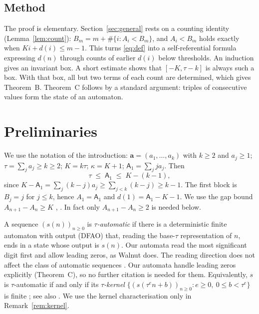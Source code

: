 \documentclass[11pt]{amsart}
\theoremstyle{definition}
\theoremstyle{remark}
\begin{document}
\subsection{Method}
The proof is elementary. Section~\ref{sec:general} rests on a counting identity (Lemma~\ref{lem:count}): $B_m=m+\#\{i:A_i<B_m\}$, and $A_i<B_m$ holds exactly when $Ki+d(i)\le m-1$. This turns \eqref{eq:def} into a self-referential formula expressing $d(n)$ through counts of earlier $d(i)$ below thresholds. An induction gives an invariant box. A short estimate shows that $[-K,\tau-k]$ is always such a box. With that box, all but two terms of each count are determined, which gives Theorem~B. Theorem~C follows by a standard argument: triples of consecutive values form the state of an automaton.

\section{Preliminaries}\label{sec:prelim}
We use the notation of the introduction: $\mathbf a=(a_1,\dots,a_k)$ with $k\ge2$ and $a_j\ge1$; $\tau=\sum_ja_j\ge k\ge2$; $K=k\tau$; $\kappa=K+1$; $\mathsf A_1=\sum_j j a_j$. Then
\begin{equation}\label{eq:A1range}
\tau\;\le\;\mathsf A_1\;\le\;K-(k-1),
\end{equation}
since $K-\mathsf A_1=\sum_j(k-j)a_j\ge\sum_{j<k}(k-j)\ge k-1$. The first block is $B_j=j$ for $j\le k$, hence $A_1=\mathsf A_1$ and $d(1)=\mathsf A_1-K-1$. We use the gap bound $A_{n+1}-A_n\ge K$ \cite[Lemma~2]{FJarxiv}, \cite[Lemma~1]{FJ}. In fact only $A_{n+1}-A_n\ge2$ is needed below.

A sequence $(s(n))_{n\ge0}$ is \emph{$\tau$-automatic} if there is a deterministic finite automaton with output (DFAO) that, reading the base-$\tau$ representation of $n$, ends in a state whose output is $s(n)$. Our automata read the most significant digit first and allow leading zeros, as Walnut does. The reading direction does not affect the class of automatic sequences \cite[Thm.~5.2.3]{AS}. Our automata handle leading zeros explicitly (Theorem~C), so no further citation is needed for them. Equivalently, $s$ is $\tau$-automatic if and only if its \emph{$\tau$-kernel} $\{(s(\tau^e n+b))_{n\ge0}: e\ge0,\ 0\le b<\tau^e\}$ is finite \cite[Thm.~6.6.2]{AS}; see also \cite{Cobham}. We use the kernel characterisation only in Remark~\ref{rem:kernel}.
\end{document}

